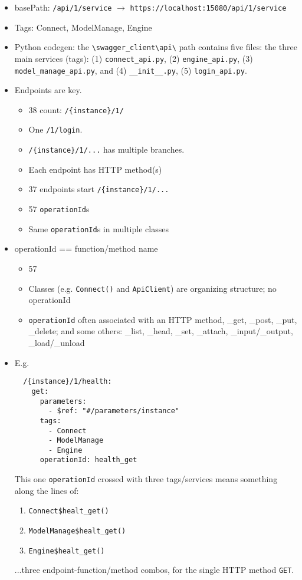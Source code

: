 \documentclass{article}
\begin{document}
\begin{itemize}
\item basePath: \verb|/api/1/service| $\rightarrow$ \verb|https://localhost:15080/api/1/service|
\item Tags: Connect, ModelManage, Engine
\item Python codegen: the \verb|\swagger_client\api\| path contains five files: the three main services (tags): (1) \verb|connect_api.py|, (2) \verb|engine_api.py|, (3) \verb|model_manage_api.py|, and (4) \verb|__init__.py|, (5) \verb|login_api.py|.
\item Endpoints are key. 
    \begin{itemize}
    \item  38 count: \verb|/{instance}/1/|
    \item One \verb|/1/login|.
    \item \verb|/{instance}/1/...| has multiple branches.
    \item Each endpoint has HTTP method(s) 
    \item 37 endpoints start \verb|/{instance}/1/...|  
    \item 57 \verb|operationId|s
    \item Same \verb|operationId|s in multiple classes
    \end{itemize}
\item operationId == function/method name
    \begin{itemize}
    \item 57
    \item Classes (e.g. \verb|Connect()| and \verb|ApiClient|) are organizing structure; no operationId
    \item \verb|operationId| often associated with an HTTP method, \_get, \_post, \_put, \_delete; and some others: \_list, \_head, \_set, \_attach, \_input/\_output, \_load/\_unload
    \end{itemize}
\item E.g.
\begin{verbatim}
  /{instance}/1/health:
    get:
      parameters:
        - $ref: "#/parameters/instance"
      tags:
        - Connect
        - ModelManage
        - Engine
      operationId: health_get
\end{verbatim}
This one \verb|operationId| crossed with three tags/services means something along the lines of:
\begin{enumerate}
\item \verb|Connect$healt_get()|
\item \verb|ModelManage$healt_get()|
\item \verb|Engine$healt_get()|
\end{enumerate}
...three endpoint-function/method combos, for the single HTTP method \verb|GET|.
\end{itemize}
\end{document}

